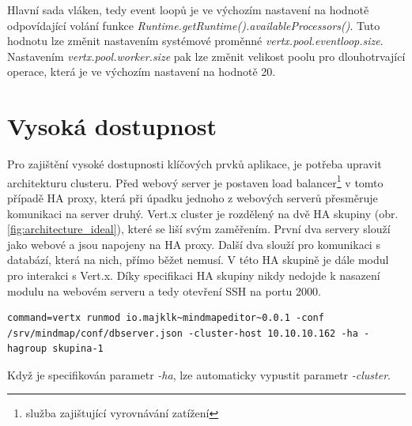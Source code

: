 Hlavní sada vláken, tedy event loopů je ve výchozím nastavení na hodnotě odpovídající volání funkce \emph{Runtime.getRuntime().availableProcessors()}. Tuto hodnotu lze změnit nastavením systémové proměnné \emph{vertx.pool.eventloop.size}. Nastavením \emph{vertx.pool.worker.size} pak lze změnit velikost poolu pro dlouhotrvající operace, která je ve výchozím nastavení na hodnotě 20.

\section{Vysoká dostupnost}

Pro zajištění vysoké dostupnosti klíčových prvků aplikace, je potřeba upravit architekturu clusteru. Před webový server je postaven load balancer\footnote{služba zajištující vyrovnávání zatížení} v tomto případě HA proxy, která při úpadku jednoho z webových serverů přesměruje komunikaci na server druhý. Vert.x cluster je rozdělený na dvě HA skupiny (obr.\ref{fig:architecture_ideal}), které se liší svým zaměřením. První dva servery slouží jako webové a jsou napojeny na HA proxy. Další dva slouží pro komunikaci s databází, která na nich, přímo běžet nemusí. V této HA skupině je dále modul pro interakci s Vert.x. Díky specifikaci HA skupiny nikdy nedojde k nasazení modulu na webovém serveru a tedy otevření SSH na portu 2000.

\begin{lstlisting}[caption=Vysoká dostupnost na databázovém serveru 2]
command=vertx runmod io.majklk~mindmapeditor~0.0.1 -conf /srv/mindmap/conf/dbserver.json -cluster-host 10.10.10.162 -ha -hagroup skupina-1
\end{lstlisting}

Když je specifikován parametr \emph{-ha}, lze automaticky vypustit parametr \emph{-cluster}.

